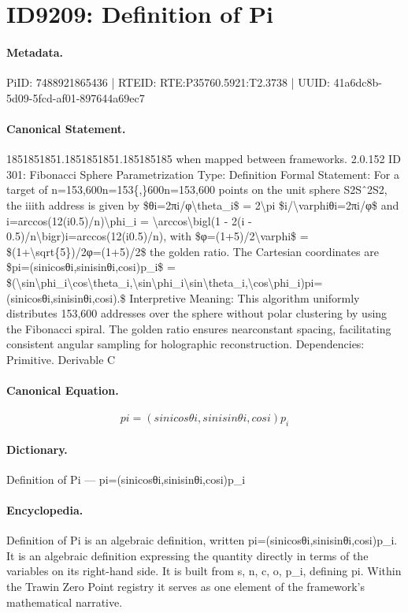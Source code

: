 \section*{ID9209: Definition of Pi}
\paragraph{Metadata.}
PiID: 7488921865436 | RTEID: RTE:P35760.5921:T2.3738 | UUID: 41a6dc8b-5d09-5fcd-af01-897644a69ec7

\paragraph{Canonical Statement.}
1851851851.1851851851.185185185 when mapped between frameworks. 2.0.152 ID 301: Fibonacci Sphere Parametrization Type: Definition Formal Statement: For a target of n=153,600n=153\{,\}600n=153,600 points on the unit sphere S2Sˆ2S2, the iiith address is given by \$θi=2πi/φ\textbackslash{}theta\_i\$ = 2\textbackslash{}pi \$i/\textbackslash{}varphiθi=2πi/φ\$ and i=arccos(12(i0.5)/n)\textbackslash{}phi\_i = \textbackslash{}arccos\textbackslash{}bigl(1 - 2(i - 0.5)/n\textbackslash{}bigr)i=arccos(12(i0.5)/n), with \$φ=(1+5)/2\textbackslash{}varphi\$ = \$(1+\textbackslash{}sqrt\{5\})/2φ=(1+5)/2\$ the golden ratio. The Cartesian coordinates are \$pi=(sinicosθi,sinisinθi,cosi)p\_i\$ = \$(\textbackslash{}sin\textbackslash{}phi\_i\textbackslash{}cos\textbackslash{}theta\_i,\textbackslash{}sin\textbackslash{}phi\_i\textbackslash{}sin\textbackslash{}theta\_i,\textbackslash{}cos\textbackslash{}phi\_i)pi=(sinicosθi,sinisinθi,cosi).\$ Interpretive Meaning: This algorithm uniformly distributes 153,600 addresses over the sphere without polar clustering by using the Fibonacci spiral. The golden ratio ensures nearconstant spacing, facilitating consistent angular sampling for holographic reconstruction. Dependencies: Primitive. Derivable C

\paragraph{Canonical Equation.}
\[
pi=(sinicosθi,sinisinθi,cosi)p_i
\]

\paragraph{Dictionary.}
Definition of Pi — pi=(sinicosθi,sinisinθi,cosi)p\_i

\paragraph{Encyclopedia.}
Definition of Pi is an algebraic definition, written pi=(sinicosθi,sinisinθi,cosi)p\_i. It is an algebraic definition expressing the quantity directly in terms of the variables on its right-hand side. It is built from s, n, c, o, p\_i, defining pi. Within the Trawin Zero Point registry it serves as one element of the framework's mathematical narrative.
